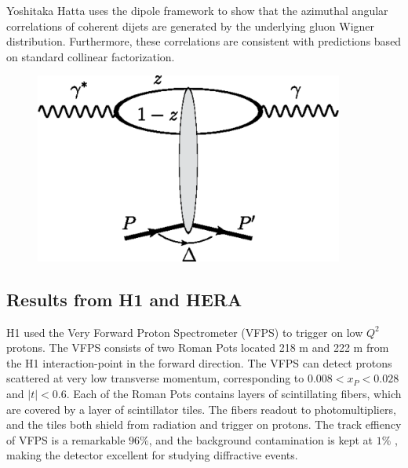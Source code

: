 Yoshitaka Hatta uses the dipole framework to show that the azimuthal angular correlations of coherent dijets are generated by the underlying gluon Wigner distribution. Furthermore, these correlations are consistent with predictions based on standard collinear factorization.

\begin{figure}[h!]
\begin{centering}
\includegraphics[width=4in]{Chapter2/importfigs/fig5_yatta_compton.png}
\par\end{centering}
\end{figure}


\subsection{Results from H1 and HERA}

H1 used the Very Forward Proton Spectrometer (VFPS) to trigger on low $Q^2$ protons. The VFPS consists of two Roman Pots located 218 m and 222 m from the H1 interaction-point in the forward direction. The VFPS can detect protons scattered at very low transverse momentum, corresponding to $0.008 < x_{P} < 0.028$ and $|t|<0.6$. Each of the Roman Pots contains layers of scintillating fibers, which are covered by a layer of scintillator tiles. The fibers readout to photomultipliers, and the tiles both shield from radiation and trigger on protons. The track effiency of VFPS is a remarkable $96 \%$, and the background contamination is kept at $1 \%$ , making the detector excellent for studying diffractive events.

